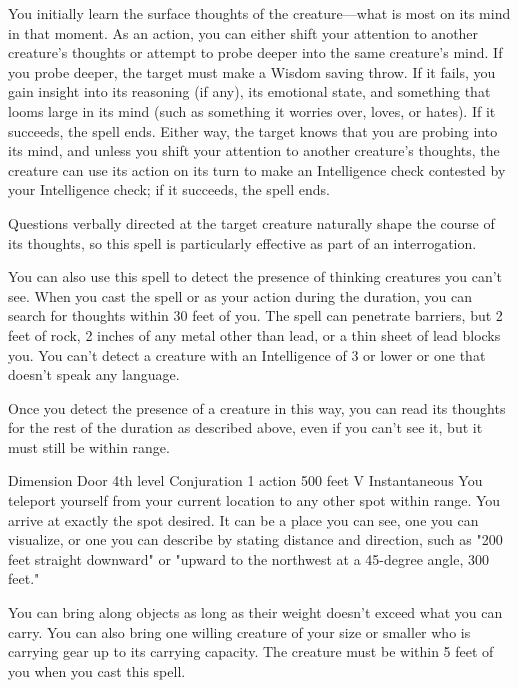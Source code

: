 \documentclass[10pt,a4paper,twoside,bg=print,twocolumn,openany,nodeprecatedcode]{dndbook}
\begin{document}
You initially learn the surface thoughts of the creature—what is most on its mind in that moment. As an action, you can either shift your attention to another creature's thoughts or attempt to probe deeper into the same creature's mind. If you probe deeper, the target must make a Wisdom saving throw. If it fails, you gain insight into its reasoning (if any), its emotional state, and something that looms large in its mind (such as something it worries over, loves, or hates). If it succeeds, the spell ends. Either way, the target knows that you are probing into its mind, and unless you shift your attention to another creature's thoughts, the creature can use its action on its turn to make an Intelligence check contested by your Intelligence check; if it succeeds, the spell ends.

Questions verbally directed at the target creature naturally shape the course of its thoughts, so this spell is particularly effective as part of an interrogation.

You can also use this spell to detect the presence of thinking creatures you can't see. When you cast the spell or as your action during the duration, you can search for thoughts within 30 feet of you. The spell can penetrate barriers, but 2 feet of rock, 2 inches of any metal other than lead, or a thin sheet of lead blocks you. You can't detect a creature with an Intelligence of 3 or lower or one that doesn't speak any language.

Once you detect the presence of a creature in this way, you can read its thoughts for the rest of the duration as described above, even if you can't see it, but it must still be within range.



\DndSpellHeader%
{Dimension Door}
{4th level Conjuration}
{1 action}
{500 feet}
{V}
{Instantaneous}
You teleport yourself from your current location to any other spot within range. You arrive at exactly the spot desired. It can be a place you can see, one you can visualize, or one you can describe by stating distance and direction, such as "200 feet straight downward" or "upward to the northwest at a 45-degree angle, 300 feet."

You can bring along objects as long as their weight doesn't exceed what you can carry. You can also bring one willing creature of your size or smaller who is carrying gear up to its carrying capacity. The creature must be within 5 feet of you when you cast this spell.
\end{document}
